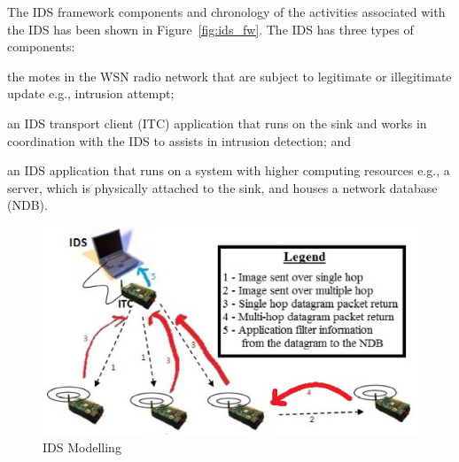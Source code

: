 \documentclass[conference,manuscript]{IEEEtran}
\begin{document}
The IDS framework components and chronology of the activities associated with the IDS has been shown in Figure~\ref{fig:ids_fw}.
The IDS has three types of components:
\begin{inparaenum}
\item the motes in the WSN radio network that are subject to legitimate or illegitimate update e.g., intrusion attempt; 
\item an IDS transport client (ITC) application that runs on the sink and works in coordination with the IDS to assists in intrusion detection; and
\item an IDS application that runs on a system with higher computing resources e.g., a server, which is physically attached to the sink, and houses a network database (NDB).
\end{inparaenum}

\begin{figure}[btp]
    \centering
    \includegraphics[width=\linewidth]{IDS}
    \caption{IDS Modelling}
    \label{fig:ids_model}
\end{figure}
\end{document}
